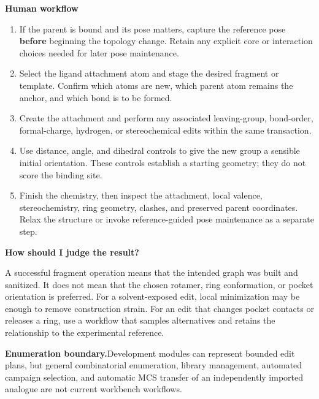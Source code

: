 \documentclass[10pt,letterpaper]{article}
\newcommand{\lead}[1]{\textbf{#1}\hspace{0.35em}}
\newcommand{\subhead}[1]{%
  \par\needspace{2\baselineskip}\vspace{2.5pt}%
  {\fontsize{10.91}{13.1}\selectfont\bfseries #1}\par\vspace{-1.5pt}}
\begin{document}
\subhead{Human workflow}

\begin{enumerate}
\item If the parent is bound and its pose matters, capture the reference pose \textbf{before} beginning the topology change. Retain any explicit core or interaction choices needed for later pose maintenance.
\item Select the ligand attachment atom and stage the desired fragment or template. Confirm which atoms are new, which parent atom remains the anchor, and which bond is to be formed.
\item Create the attachment and perform any associated leaving-group, bond-order, formal-charge, hydrogen, or stereochemical edits within the same transaction.
\item Use distance, angle, and dihedral controls to give the new group a sensible initial orientation. These controls establish a starting geometry; they do not score the binding site.
\item Finish the chemistry, then inspect the attachment, local valence, stereochemistry, ring geometry, clashes, and preserved parent coordinates. Relax the structure or invoke reference-guided pose maintenance as a separate step.
\end{enumerate}

\subhead{How should I judge the result?}

A successful fragment operation means that the intended graph was built and sanitized. It does not mean that the chosen rotamer, ring conformation, or pocket orientation is preferred. For a solvent-exposed edit, local minimization may be enough to remove construction strain. For an edit that changes pocket contacts or releases a ring, use a workflow that samples alternatives and retains the relationship to the experimental reference.

\lead{Enumeration boundary.}Development modules can represent bounded edit plans, but general combinatorial enumeration, library management, automated campaign selection, and automatic MCS transfer of an independently imported analogue are not current workbench workflows.
\end{document}
